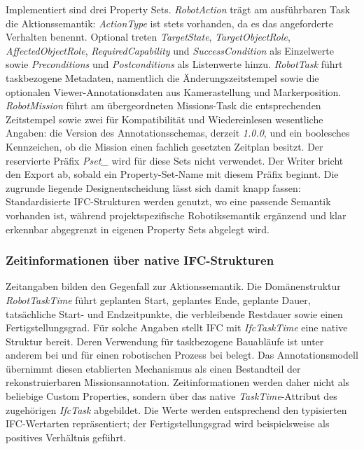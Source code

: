 Implementiert sind drei Property Sets. \textit{RobotAction} trägt am ausführbaren Task die
Aktionssemantik: \textit{ActionType} ist stets vorhanden, da es das angeforderte Verhalten benennt.
Optional treten \textit{TargetState}, \textit{TargetObjectRole}, \textit{AffectedObjectRole},
\textit{RequiredCapability} und \textit{SuccessCondition} als Einzelwerte sowie
\textit{Preconditions} und \textit{Postconditions} als Listenwerte hinzu. \textit{RobotTask} führt
taskbezogene Metadaten, namentlich die Änderungszeitstempel sowie die optionalen
Viewer-Annotationsdaten aus Kamerastellung und Markerposition. \textit{RobotMission} führt am
übergeordneten Missions-Task die entsprechenden Zeitstempel sowie zwei für Kompatibilität und
Wiedereinlesen wesentliche Angaben: die Version des Annotationsschemas, derzeit \textit{1.0.0}, und
ein boolesches Kennzeichen, ob die Mission einen fachlich gesetzten Zeitplan besitzt. Der
reservierte Präfix \textit{Pset\_} wird für diese Sets nicht verwendet. Der Writer bricht den Export
ab, sobald ein Property-Set-Name mit diesem Präfix beginnt. Die zugrunde liegende Designentscheidung
lässt sich damit knapp fassen: Standardisierte IFC-Strukturen werden genutzt, wo eine passende
Semantik vorhanden ist, während projektspezifische Robotiksemantik ergänzend und klar erkennbar
abgegrenzt in eigenen Property Sets abgelegt wird.

\subsubsection{Zeitinformationen über native IFC-Strukturen}
Zeitangaben bilden den Gegenfall zur Aktionssemantik. Die Domänenstruktur \textit{RobotTaskTime}
führt geplanten Start, geplantes Ende, geplante Dauer, tatsächliche Start- und Endzeitpunkte, die
verbleibende Restdauer sowie einen Fertigstellungsgrad. Für solche Angaben stellt IFC mit
\textit{IfcTaskTime} eine native Struktur bereit. Deren Verwendung für taskbezogene Bauabläufe ist
unter anderem bei \textcite{sheik2023exchanging} und für einen robotischen Prozess bei
\textcite{slepicka2026fim} belegt. Das Annotationsmodell übernimmt diesen etablierten Mechanismus als
einen Bestandteil der rekonstruierbaren Missionsannotation. Zeitinformationen werden daher nicht
als beliebige Custom Properties, sondern über das native \textit{TaskTime}-Attribut des zugehörigen
\textit{IfcTask} abgebildet. Die Werte werden entsprechend den typisierten IFC-Wertarten
repräsentiert; der Fertigstellungsgrad wird beispielsweise als positives Verhältnis geführt.

